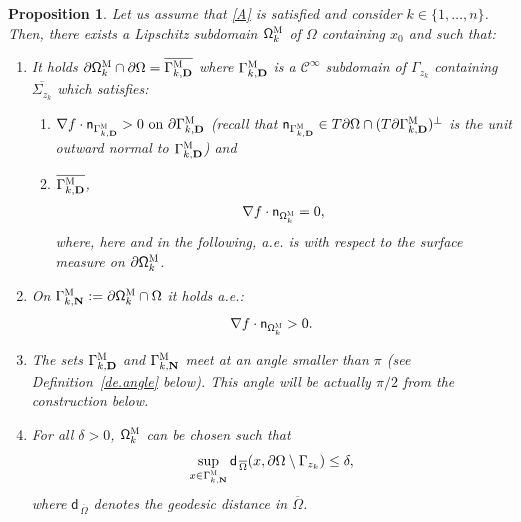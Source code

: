 \documentclass[JEP,XML,SOM,Unicode,NoEqCountersInSection,NoFloatCountersInSection,published]{cedram}
\newcommand{\mbf}[1]{\mathbf{#1}}
\let\pa\partial
\theoremstyle{plain}
\newtheorem{proposition}{Proposition}
\theoremstyle{definition}
\begin{document}
\begin{proposition}\label{pr.omegakpoint}
Let us assume that \ref{A} is satisfied and
consider $k\in \{1,\ldots,n\}$. Then, there exists a Lipschitz
subdomain $\mathsf \Omega_k^{\textsc{M}}$ of $\Omega$ containing
$x_0$ and such that:
\begin{enumerate}
\item\label{pr.omegakpoint1}
It holds $\pa \mathsf \Omega_k^{\textsc{M}} \cap \partial \Omega = \overline{\Gamma_{k,\mbf D}^{\textsc{M}}}$ where $\Gamma_{k,\mbf D}^{\textsc{M}}$ is a $\mathcal C^\infty$ subdomain of $\Gamma_{z_k}$ containing $\overline{\Sigma_{z_k}}$ which satisfies:
\begin{enumerate}
\item\label{pr.omegakpoint1a}
$\nabla f\cdot \mathsf n_{ \Gamma_{k,\mbf D}^{\textsc{M}} }>0 \text{ on } \pa \Gamma_{k,\mbf D}^{\textsc{M}}$ (recall that $ \mathsf n_{ \Gamma_{k,\mbf D}^{\textsc{M}} }\in T\partial \Omega\cap (T\pa \Gamma_{k,\mbf D}^{\textsc{M}})^\bot$ is the unit outward normal to $ \Gamma_{k,\mbf D}^{\textsc{M}}$) and
\item\label{pr.omegakpoint1b}
 $\overline{ \Gamma_{k,\mbf D}^{\textsc{M}}}$,
\[
\nabla f\cdot \mathsf n_{ \mathsf \Omega_k^{\textsc{M}}}=0,
\]
where, here and in the following, a.e. is with respect to the surface measure on $\pa \mathsf \Omega_k^{\textsc{M}}$.
\end{enumerate}

\item\label{pr.omegakpoint2}
On $\Gamma_{k,\mbf N}^{\textsc{M}}:=\pa \mathsf \Omega_k^{\textsc{M}} \cap \Omega$ it holds a.e.:
\[
\nabla f \cdot \mathsf n_{\mathsf \Omega_k^{\textsc{M}}} >0.
\]

\item\label{pr.omegakpoint3}
The sets $\Gamma_{k,\mbf D}^{\textsc{M}}$ and $\Gamma_{k,\mbf N}^{\textsc{M}}$ meet at an angle smaller than
$\pi$ (see Definition~\ref{de.angle} below). This angle will be actually $\pi/2$ from the construction below.

\item\label{pr.omegakpoint4}
For all $\delta>0$, $\mathsf \Omega_k^{\textsc{M}}$ can be chosen such that
\begin{equation}\label{eq.gamma2_close_to_Bzc}
\sup_{x\in \Gamma_{k,\mbf N}^{\textsc{M}}}\mathsf d_{\, \overline \Omega}(x, \partial \Omega \setminus \Gamma_{z_k})\le\delta,
\end{equation}
where $\mathsf d_{\, \overline \Omega}$ denotes the geodesic distance in $\overline \Omega$.
\end{enumerate}
\end{proposition}
\end{document}
